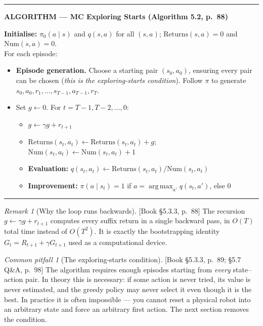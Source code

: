 \documentclass[11pt, letterpaper]{article}
\theoremstyle{runin}
\theoremstyle{runinplain}
\theoremstyle{remark}
\newtheorem*{remark}{Remark}
\newtheorem*{warning}{Common pitfall}
\newcommand{\argmax}{\operatorname*{arg\,max}}
\newcommand{\bkin}[1]{{\color{bookblue}\small[\textsf{Book #1}]}}
\newenvironment{algobox}[1]
  {\par\medskip\noindent\rule{\textwidth}{0.9pt}\par\nobreak\vspace{0.25em}
   \noindent\textbf{\small ALGORITHM --- #1}\par\nobreak\vspace{0.15em}
   \small}
  {\par\nobreak\vspace{0.25em}\noindent\rule{\textwidth}{0.9pt}\par\medskip}
\begin{document}
\begin{algobox}{MC Exploring Starts (Algorithm 5.2, p.~88)}
\textbf{Initialise:} $\pi_0(a\mid s)$ and $q(s,a)$ for all $(s,a)$;
$\mathrm{Returns}(s,a)=0$ and $\mathrm{Num}(s,a)=0$.\\
For each episode:
\begin{itemize}\itemsep0pt
  \item \textbf{Episode generation.} Choose a starting pair $(s_0,a_0)$, ensuring
        every pair can be chosen (\emph{this is the exploring-starts condition}).
        Follow $\pi$ to generate $s_0,a_0,r_1,\dots,s_{T-1},a_{T-1},r_T$.
  \item Set $g\leftarrow 0$. For $t=T-1,T-2,\dots,0$:
    \begin{itemize}\itemsep0pt
      \item $g\leftarrow \gamma g + r_{t+1}$
      \item $\mathrm{Returns}(s_t,a_t)\leftarrow \mathrm{Returns}(s_t,a_t)+g$;\quad
            $\mathrm{Num}(s_t,a_t)\leftarrow \mathrm{Num}(s_t,a_t)+1$
      \item \textbf{Evaluation:} $q(s_t,a_t)\leftarrow \mathrm{Returns}(s_t,a_t)/\mathrm{Num}(s_t,a_t)$
      \item \textbf{Improvement:} $\pi(a\mid s_t)=1$ if $a=\argmax_{a'}q(s_t,a')$, else $0$
    \end{itemize}
\end{itemize}
\end{algobox}

\begin{remark}[Why the loop runs backwards]
\bkin{\S5.3.3, p.~88} The recursion $g\leftarrow\gamma g+r_{t+1}$ computes every
suffix return in a single backward pass, in $O(T)$ total time instead of $O(T^2)$.
It is exactly the bootstrapping identity $G_t=R_{t+1}+\gamma G_{t+1}$ used as a
computational device.
\end{remark}

\begin{warning}[The exploring-starts condition]
\bkin{\S5.3.3, p.~89; \S5.7 Q\&A, p.~98} The algorithm requires enough episodes
starting from \emph{every} state--action pair. In theory this is necessary: if some
action is never tried, its value is never estimated, and the greedy policy may
never select it even though it is the best. In practice it is often impossible ---
you cannot reset a physical robot into an arbitrary state and force an arbitrary
first action. The next section removes the condition.
\end{warning}
\end{document}
